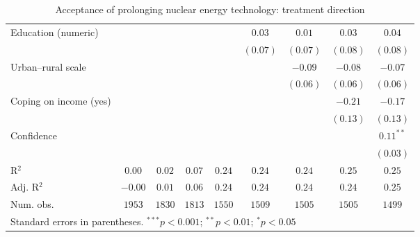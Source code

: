 \begin{table}[h]
\begin{center}
\begin{tabular}{l c c c c c c c c}
Education (numeric)                                                             &              &               &               &               & $0.03$        & $0.01$        & $0.03$        & $0.04$        \\
                                                                                &              &               &               &               & $(0.07)$      & $(0.07)$      & $(0.08)$      & $(0.08)$      \\
Urban–rural scale                                                               &              &               &               &               &               & $-0.09$       & $-0.08$       & $-0.07$       \\
                                                                                &              &               &               &               &               & $(0.06)$      & $(0.06)$      & $(0.06)$      \\
Coping on income (yes)                                                          &              &               &               &               &               &               & $-0.21$       & $-0.17$       \\
                                                                                &              &               &               &               &               &               & $(0.13)$      & $(0.13)$      \\
Confidence                                                                      &              &               &               &               &               &               &               & $0.11^{**}$   \\
                                                                                &              &               &               &               &               &               &               & $(0.03)$      \\
\hline
R$^2$                                                                           & $0.00$       & $0.02$        & $0.07$        & $0.24$        & $0.24$        & $0.24$        & $0.25$        & $0.25$        \\
Adj. R$^2$                                                                      & $-0.00$      & $0.01$        & $0.06$        & $0.24$        & $0.24$        & $0.24$        & $0.24$        & $0.25$        \\
Num. obs.                                                                       & $1953$       & $1830$        & $1813$        & $1550$        & $1509$        & $1505$        & $1505$        & $1499$        \\
\hline
\multicolumn{9}{l}{\scriptsize{Standard errors in parentheses. $^{***}p<0.001$; $^{**}p<0.01$; $^{*}p<0.05$}}
\end{tabular}
\caption{Acceptance of prolonging nuclear energy technology: treatment direction}
\label{table:acceptance_prolong_nucs_treatment_direction}
\end{center}
\end{table}

